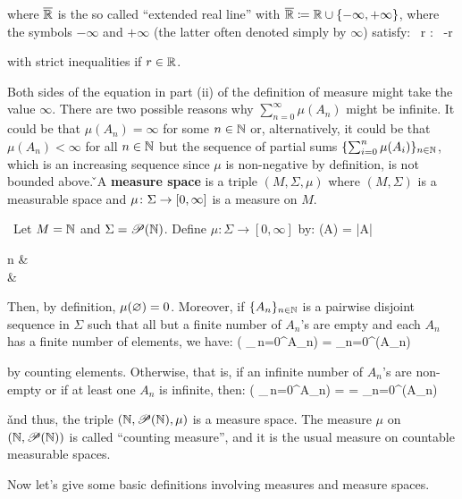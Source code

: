 where $\overline{\mathbb{R}}$ is the so called ``extended real line'' with $\overline{\mathbb{R}} \coloneqq \mathbb{R} \cup \{-\infty,
+\infty\}$, where the symbols $-\infty$ and $+\infty$ (the latter often denoted simply by $\infty$) satisfy:
\bse
\forall \, r \in \overline{\R} : \ -\infty\leq r \leq \infty
\ese

with strict inequalities if $r\in\mathbb{R}$.
\een
\ed

Both sides of the equation in part (ii) of the definition of measure might take the value $\infty$. There are two
possible reasons why $\sum_{n=0}^{\infty}\mu(A_n)$ might be infinite. It could be that $\mu(A_n) = \infty$ for some
$n\in \mathbb{N}$ or, alternatively, it could be that $\mu(A_n) < \infty$ for all $n \in \mathbb{N}$ but the sequence of partial sums
$\{ \sum_{i=0}^{n}\mu(A_i)\}_{n\in\mathbb{N}}$, which is an increasing sequence since $\mu$ is non-negative by definition, is
not bounded above. \v

A \textbf{measure space} is a triple $(M,\Sigma,\mu)$ where $(M,\Sigma)$ is a measurable space and
$\mu\colon\Sigma\to[0,\infty]$ is a measure on $M$.
\ed

\be \
Let $M=\mathbb{N}$ and $\Sigma=\mathscr{P}(\mathbb{N})$. Define $\mu : \Sigma \to [0, \infty]$ by:
\bse
\mu(A) = |A| \coloneqq
\begin{cases}
n & \\ \infty & 
\end{cases}
\ese

Then, by definition, $\mu(\varnothing) =0$. Moreover, if $\{A_n\}_{n\in\mathbb{N}}$ is a pairwise disjoint sequence in $\Sigma$ such
that all but a finite number of $A_n$'s are empty and each $A_n$ has a finite number of elements, we have:
\bse
\mu \biggl( \bigcup_{\,n=0}^{\infty}A_n\biggr) = \sum_{n=0}^{\infty}\mu(A_n)
\ese

by counting elements. Otherwise, that is, if an infinite number of $A_n$'s are non-empty or if at least one $A_n$ is
infinite, then:
\bse
\mu \biggl( \bigcup_{\,n=0}^{\infty}A_n\biggr) = \infty = \sum_{n=0}^{\infty}\mu(A_n)
\ese

\v

and thus, the triple $(\mathbb{N},\mathscr{P}(\mathbb{N}),\mu)$ is a measure space. The measure $\mu$ on $(\mathbb{N},\mathscr{P}(\mathbb{N}))$ is
called ``counting measure'', and it is the usual measure on countable measurable spaces.
\ee

Now let's give some basic definitions involving measures and measure spaces.

